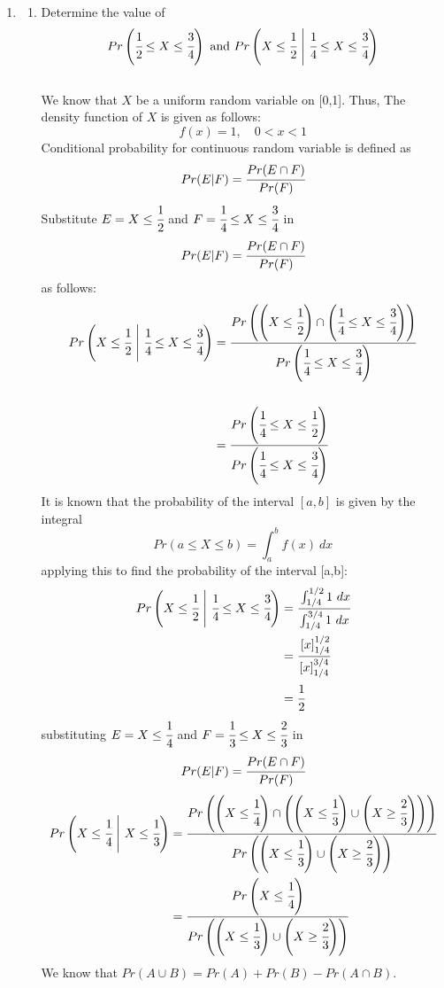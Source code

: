 \documentclass{article}
\begin{document}
\begin{enumerate}
\newpage
\item
    \begin{enumerate}
        \item 
        Determine the value of 
        \[ 
            Pr\left(\cfrac{1}{2} \leq X \leq \cfrac{3}{4}\right) \text{ and } Pr\left(X \leq \cfrac{1}{2}\  \middle| \ \cfrac{1}{4} \leq X \leq \cfrac{3}{4}\right)
        \]\\
        We know that \(X\) be a uniform random variable on [0,1]. Thus,
        The density function of \(X\) is given as follows:
        \[ 
            f(x) = 1, \quad 0 < x < 1 
        \]
        Conditional probability for continuous random variable is defined as
        \[ 
            Pr(E|F) = \cfrac{Pr(E \cap F)}{Pr(F)} 
        \]
        Substitute \( E = X \leq \cfrac{1}{2} \) and \( F = \cfrac{1}{4} \leq X \leq \cfrac{3}{4} \) in 
        \[ 
            Pr(E|F) = \cfrac{Pr(E \cap F)}{Pr(F)}
        \]
        as follows:
        \begin{align*}
            Pr\left(X \leq \cfrac{1}{2}\  \middle| \ \cfrac{1}{4} \leq X \leq \cfrac{3}{4}\right) &= \cfrac{Pr\left(\left(X \leq \cfrac{1}{2}\right)\cap \left(\cfrac{1}{4} \leq X \leq \cfrac{3}{4}\right)\right)}{Pr\left(\cfrac{1}{4} \leq X \leq \cfrac{3}{4}\right)}\\\\
            &= \cfrac{Pr\left(\cfrac{1}{4} \leq X \leq \cfrac{1}{2}\right)}{Pr\left(\cfrac{1}{4} \leq X \leq \cfrac{3}{4}\right)}
        \end{align*}
        It is known that the probability of the interval \( [a,b] \) is given by the integral
        \[ 
            Pr(a \leq X \leq b) = \int_a^b f(x) \ dx 
        \]
        applying this to find the probability of the interval [a,b]:
        \begin{align*}
            Pr\left(X \leq \cfrac{1}{2}\ \middle| \ \cfrac{1}{4} \leq X \leq \cfrac{3}{4}\right) &= \cfrac{\int_{1/4}^{1/2} 1 \ dx}{\int_{1/4}^{3/4} 1 \ dx}\\
            &= \cfrac{\left[ x \right]_{1/4}^{1/2}}{\left[ x \right]_{1/4}^{3/4}}\\
            &= \cfrac{1}{2}
        \end{align*}
        substituting \( E = X \leq \cfrac{1}{4} \) and \( F = \cfrac{1}{3} \leq X \leq \cfrac{2}{3} \) in
        \[ 
            Pr(E|F) = \cfrac{Pr(E \cap F)}{Pr(F)}
        \]
        \begin{align*}
            Pr\left( X \leq \cfrac{1}{4}\ \middle| \ X \leq \cfrac{1}{3} \right) &= \cfrac{Pr\left(\left(X \leq \cfrac{1}{4}\right) \cap \left(\left(X \leq \cfrac{1}{3}\right) \cup \left(X \geq \cfrac{2}{3}\right) \right) \right)}{Pr\left( \left(X \leq \cfrac{1}{3}\right) \cup \left(X \geq \cfrac{2}{3}\right) \right)}\\ 
            &= \cfrac{Pr\left( X \leq \cfrac{1}{4} \right)}{Pr\left( \left(X \leq \cfrac{1}{3}\right) \cup \left(X \geq \cfrac{2}{3}\right) \right)}
        \end{align*}
        We know that \( Pr(A \cup B) = Pr(A) + Pr(B) - Pr(A \cap B) \).


\end{enumerate}
\end{enumerate}
\end{document}

